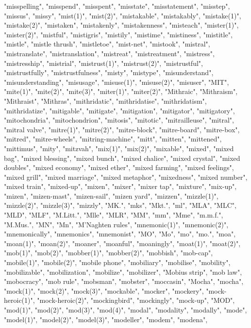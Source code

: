 "misspelling",
"misspend",
"misspent",
"misstate",
"misstatement",
"misstep",
"missus",
"missy",
"mist(1)",
"mist(2)",
"mistakable",
"mistakably",
"mistake(1)",
"mistake(2)",
"mistaken",
"mistakenly",
"mistakenness",
"misteach",
"mister(1)",
"mister(2)",
"mistful",
"mistigris",
"mistily",
"mistime",
"mistiness",
"mistitle",
"mistle",
"mistle thrush",
"mistletoe",
"mist-net",
"mistook",
"mistral",
"mistranslate",
"mistranslation",
"mistreat",
"mistreatment",
"mistress",
"mistresship",
"mistrial",
"mistrust(1)",
"mistrust(2)",
"mistrustful",
"mistrustfully",
"mistrustfulness",
"misty",
"mistype",
"misunderstand",
"misunderstanding",
"misusage",
"misuse(1)",
"misuse(2)",
"misuser",
"MIT",
"mite(1)",
"mite(2)",
"mite(3)",
"miter(1)",
"miter(2)",
"Mithraic",
"Mithraism",
"Mithraist",
"Mithras",
"mithridatic",
"mithridatise",
"mithridatism",
"mithridatize",
"mitigable",
"mitigate",
"mitigation",
"mitigator",
"mitigatory",
"mitochondria",
"mitochondrion",
"mitosis",
"mitotic",
"mitrailleuse",
"mitral",
"mitral valve",
"mitre(1)",
"mitre(2)",
"mitre-block",
"mitre-board",
"mitre-box",
"mitred",
"mitre-wheels",
"mitring-machine",
"mitt",
"mitten",
"mittened",
"mittimus",
"mity",
"mitzvah",
"mix(1)",
"mix(2)",
"mixable",
"mixed",
"mixed bag",
"mixed blessing",
"mixed bunch",
"mixed chalice",
"mixed crystal",
"mixed doubles",
"mixed economy",
"mixed ether",
"mixed farming",
"mixed feelings",
"mixed grill",
"mixed marriage",
"mixed metaphor",
"mixedness",
"mixed number",
"mixed train",
"mixed-up",
"mixen",
"mixer",
"mixer tap",
"mixture",
"mix-up",
"mizen",
"mizen-mast",
"mizen-sail",
"mizen yard",
"mizzen",
"mizzle(1)",
"mizzle(2)",
"mizzle(3)",
"mizzly",
"MK.",
"mks",
"Mkt.",
"ml",
"MLA",
"MLC",
"MLD",
"MLF",
"M.Litt.",
"Mlle",
"MLR",
"MM",
"mm",
"Mme",
"m.m.f.",
"M.Mus.",
"MN",
"Mn",
"M'Naghten rules",
"mnemonic(1)",
"mnemonic(2)",
"mnemonically",
"mnemonics",
"mnemonist",
"MO",
"Mo",
"mo",
"mo.",
"moa",
"moan(1)",
"moan(2)",
"moaner",
"moanful",
"moaningly",
"moat(1)",
"moat(2)",
"mob(1)",
"mob(2)",
"mobber(1)",
"mobber(2)",
"mobbish",
"mob-cap",
"mobile(1)",
"mobile(2)",
"mobile phone",
"mobiliary",
"mobilise",
"mobility",
"mobilizable",
"mobilization",
"mobilize",
"mobilizer",
"Mobius strip",
"mob law",
"mobocracy",
"mob rule",
"mobsman",
"mobster",
"moccasin",
"Mocha",
"mocha",
"mock(1)",
"mock(2)",
"mock(3)",
"mockable",
"mocker",
"mockery",
"mock-heroic(1)",
"mock-heroic(2)",
"mockingbird",
"mockingly",
"mock-up",
"MOD",
"mod(1)",
"mod(2)",
"mod(3)",
"mod(4)",
"modal",
"modality",
"modally",
"mode",
"model(1)",
"model(2)",
"model(3)",
"modeller",
"modem",
"modena",
